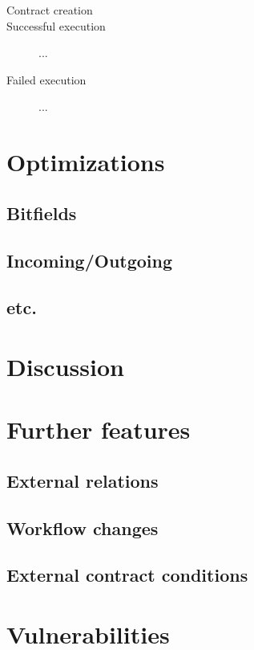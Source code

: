 \documentclass{article}
\begin{document}
	\begin{description}
		\item[Contract creation]
		\item[Successful execution] ...
		\item[Failed execution] ... 
	\end{description}

	\section{Optimizations}

		\subsection{Bitfields}

		\subsection{Incoming/Outgoing}

		\subsection{etc.}


	\section{Discussion}

	\section{Further features}

		\subsection{External relations}

		\subsection{Workflow changes}

		\subsection{External contract conditions}

	\section{Vulnerabilities}
\end{document}
